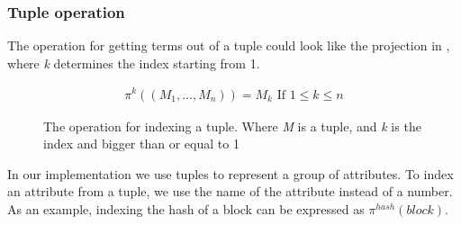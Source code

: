 \subsubsection{Tuple operation}
The operation for getting terms out of a tuple could look like the projection in , where \textit{k} determines the index starting from 1.
\begin{figure}[h]
    \begin{align*}
        \pi^k((M_1,..., M_n))=M_k \text{ If } 1\leq k \leq n
    \end{align*}
    \caption{The operation for indexing a tuple. Where \textit{M} is a tuple, and \textit{k} is the index and bigger than  or equal to 1}
\label{tupleop}
\end{figure}

In our implementation we use tuples to represent a group of attributes. To index an attribute from a tuple, we use the name of the attribute instead of a number. As an example, indexing the hash of a block can be expressed as $\pi^{hash}(block)$.
\FloatBarrier